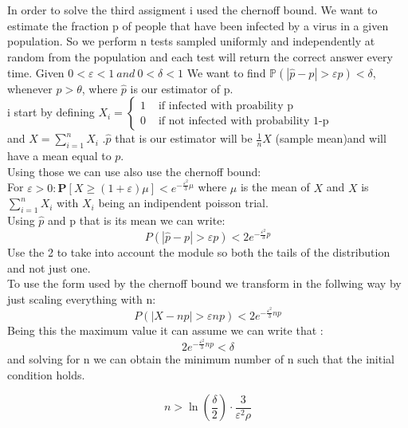 \documentclass{article}
\begin{document}
\section{}
In order to solve the third assigment i used the chernoff bound.
We want to estimate the fraction p of people that have been infected by a virus in a given population.
So we perform n tests sampled uniformly and independently at random from the population and each test will return the correct answer every time.
Given $0<\varepsilon<1   \ and  \ 0<\delta<1$ We want to find $\mathbb{P}(|\hat{p}-p|>\varepsilon p)<\delta$, whenever $p>\theta$,
where $\hat{p}$ is our estimator of p.\\
i start by defining \( X_{i}=\left\{\begin{array}{ll}1 & \text { if \ infected \ with \ proability \ p} \\ 0 & \text { if\ not \ infected \ with \ probability \ 1-p }\end{array}\right. \)
\\and $X=\sum ^{n}_{i=1}X_{i}$ .$\hat{p}$ that is our estimator will be \( \frac{1}{n} X \) (sample mean)and will have a mean equal to $p$.\\Using those we can use also use the chernoff bound:\\For $\varepsilon>0: \mathbf{P}[X \geq(1+\varepsilon) \mu]<e^{-\frac{\varepsilon^2}{3} \mu}$ where $\mu$ is the mean of $X$ and $X$ is $\sum ^{n}_{i=1}X_{i}$ with $X_{i}$ being an indipendent poisson trial.\\
Using $\hat{p}$ and p that is its mean we can write:\\
$$
P(|\hat{p}-p|>\varepsilon p)<2e^{-\frac{\varepsilon^2}{3} p}
$$
Use the 2 to take into account the module so both the tails of the distribution and not just one.\\
To use the form used by the chernoff bound we transform in the follwing way by just scaling everything with n:\\
$$
P(|X-np|>\varepsilon n p)<2e^{-\frac{\varepsilon^2}{3} np}
$$
Being this the maximum value it can assume we can write that :
$$2e^{-\frac{\varepsilon^2}{3} np}<\delta$$ and solving for n we can obtain the minimum number of n such that the initial condition holds.

$$
n>\ln \left(\frac{\delta}{2}\right) \cdot \frac{3}{\varepsilon^2 \rho}
$$




\section{}
\end{document}
